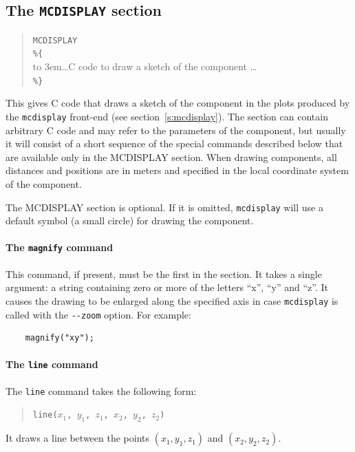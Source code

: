{\subsection{The \texttt{MCDISPLAY} section}
\label{s:comp-mcdisplay}

\begin{quote}
  \texttt{MCDISPLAY} \\
  \verb|%{| \\
  \hbox to 3em{}\ldots C code to draw a sketch of the component \ldots \\
  \verb|%}|
\end{quote}
This gives C code that draws a sketch of the component in the plots
produced by the \verb+mcdisplay+ front-end (see
section~\ref{s:mcdisplay}). The section can contain arbitrary C code and
may refer to the parameters of the component, but usually it will
consist of a short sequence of the special commands described below that
are available only in the MCDISPLAY section.
When drawing components, all distances and positions are in meters and
specified in the local coordinate system of the component.

The MCDISPLAY section is optional. If it is omitted, \verb+mcdisplay+
will use a default symbol (a small circle) for drawing the component.

\paragraph{The {\tt magnify} command}

This command, if present, must be the first in the section. It takes a
single argument: a string containing zero or more of the letters ``x'',
``y'' and ``z''. It causes the drawing to be enlarged along the
specified axis in case \verb+mcdisplay+ is called with the \verb+--zoom+
option. For example:
\begin{verbatim}
    magnify("xy");
\end{verbatim}


\paragraph{The {\tt line} command}

The {\tt line} command takes the following form:
\begin{quote}
  \texttt{line($x_1$, $y_1$, $z_1$, $x_2$, $y_2$, $z_2$)}
\end{quote}
It draws a line between the points $(x_1, y_1, z_1)$ and $(x_2, y_2,
z_2)$.


}
